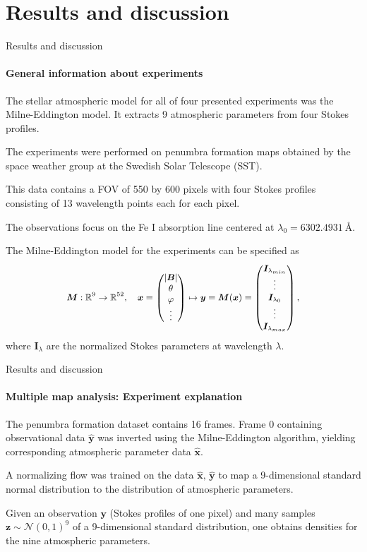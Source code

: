 \documentclass{beamer}
\newcommand\matr[1]{\ensuremath{\boldsymbol{\mathbf{#1}}}}
\newcommand\vect[1]{\ensuremath{\bm{#1}}}
\begin{document}
\section{Results and discussion}
\begin{frame}[allowframebreaks]{Results and discussion}
\framesubtitle{General information about experiments}
The stellar atmospheric model for all of four presented experiments was the Milne-Eddington model. It extracts 9 atmospheric parameters from four Stokes profiles.

The experiments were performed on penumbra formation maps obtained by the space weather group at the Swedish Solar Telescope (SST).

This data contains a FOV of 550 by 600 pixels with four Stokes profiles consisting of 13 wavelength points each for each pixel.

The observations focus on the Fe I absorption line centered at $\lambda_0 = \SI{6302.4931}{\angstrom}$.

The Milne-Eddington model for the experiments can be specified as
\begin{gather}\small\begin{gathered}\label{model:Milne-Eddington_obs}
	\vect{M}:\mathbb{R}^9 \rightarrow \mathbb{R}^{52}, \quad \vect{x} = \begin{pmatrix}
		|\vect{B}| \\
		\theta \\
		\varphi \\
            \vdots
	\end{pmatrix} \mapsto \vect{y} = \vect{M}(\vect{x}) = \begin{pmatrix}
		\vect{I}_{\lambda_{min}} \\
		\vdots \\
		\vect{I}_{\lambda_0} \\
		\vdots \\
		\vect{I}_{\lambda_{max}}
	\end{pmatrix},
 \end{gathered}\end{gather} where $\vect{I}_\lambda$ are the normalized Stokes parameters at wavelength $\lambda$.
\end{frame}

\begin{frame}[allowframebreaks]{Results and discussion}
\framesubtitle{Multiple map analysis: Experiment explanation} %
The penumbra formation dataset contains 16 frames. Frame 0 containing observational data $\hat{\matr{y}}$ was inverted using the Milne-Eddington algorithm, yielding corresponding atmospheric parameter data $\hat{\matr{x}}$.

A normalizing flow was trained on the data $\hat{\matr{x}}, \,\hat{\matr{y}}$ to map a 9-dimensional standard normal distribution to the distribution of atmospheric parameters.

Given an observation $\vect{y}$ (Stokes profiles of one pixel) and many samples $\vect{z} \sim \mathcal{N}(0,1)^9$ of a 9-dimensional standard distribution, one obtains densities for the nine atmospheric parameters.
\end{frame}
\end{document}
